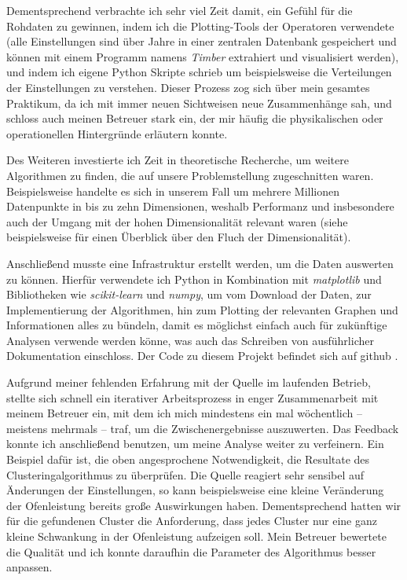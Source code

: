 \documentclass[11pt, a4paper, titlepage, headings=standardclasses]{scrartcl}
\begin{document}
Dementsprechend verbrachte ich sehr viel Zeit damit, ein Gefühl für die Rohdaten zu gewinnen, indem ich die Plotting-Tools der Operatoren verwendete (alle Einstellungen sind über Jahre in einer zentralen Datenbank gespeichert und können mit einem Programm namens \textit{Timber} extrahiert und visualisiert werden), und indem ich eigene Python Skripte schrieb um beispielsweise die Verteilungen der Einstellungen zu verstehen. Dieser Prozess zog sich über mein gesamtes Praktikum, da ich mit immer neuen Sichtweisen neue Zusammenhänge sah, und schloss auch meinen Betreuer stark ein, der mir häufig die physikalischen oder operationellen Hintergründe erläutern konnte.

Des Weiteren investierte ich Zeit in theoretische Recherche, um weitere Algorithmen zu finden, die auf unsere Problemstellung zugeschnitten waren. Beispielsweise handelte es sich in unserem Fall um mehrere Millionen Datenpunkte in bis zu zehn Dimensionen, weshalb Performanz und insbesondere auch der Umgang mit der hohen Dimensionalität relevant waren (siehe beispielsweise \cite{Verleysen:CurseDimensionalityData} für einen Überblick über den Fluch der Dimensionalität).

Anschließend musste eine Infrastruktur erstellt werden, um die Daten auswerten zu können. Hierfür verwendete ich Python in Kombination mit \textit{matplotlib} und Bibliotheken wie \textit{scikit-learn} und \textit{numpy}, um vom Download der Daten, zur Implementierung der Algorithmen, hin zum Plotting der relevanten Graphen und Informationen alles zu bündeln, damit es möglichst einfach auch für zukünftige Analysen verwende werden könne, was auch das Schreiben von ausführlicher Dokumentation einschloss. Der Code zu diesem Projekt befindet sich auf github \cite{Mihailescu:ionsrcopt}.

Aufgrund meiner fehlenden Erfahrung mit der Quelle im laufenden Betrieb, stellte sich schnell ein iterativer Arbeitsprozess in enger Zusammenarbeit mit meinem Betreuer ein, mit dem ich mich mindestens ein mal wöchentlich -- meistens mehrmals -- traf, um die Zwischenergebnisse auszuwerten. Das Feedback konnte ich anschließend benutzen, um meine Analyse weiter zu verfeinern. Ein Beispiel dafür ist, die oben angesprochene Notwendigkeit, die Resultate des Clusteringalgorithmus zu überprüfen. Die Quelle reagiert sehr sensibel auf Änderungen der Einstellungen, so kann beispielsweise eine kleine Veränderung der Ofenleistung bereits große Auswirkungen haben. Dementsprechend hatten wir für die gefundenen Cluster die Anforderung, dass jedes Cluster nur eine ganz kleine Schwankung in der Ofenleistung aufzeigen soll. Mein Betreuer bewertete die Qualität und ich konnte daraufhin die Parameter des Algorithmus besser anpassen.
\end{document}

